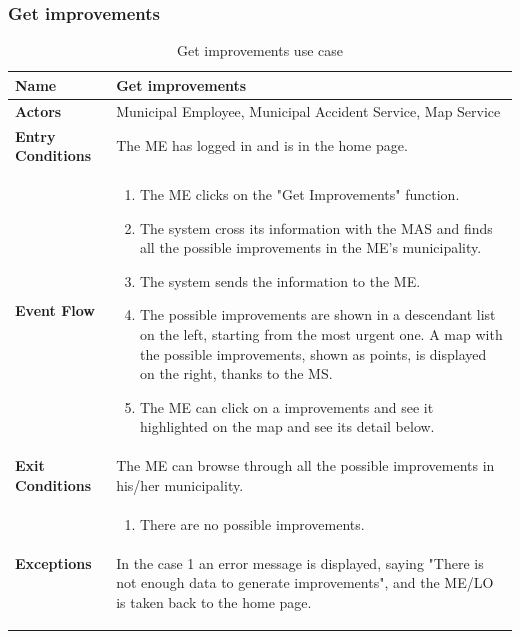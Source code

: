 					
					\clearpage
					\subsubsection{Get improvements}
					\begin{table}[!h]
						\centering
						\vspace{-2mm}
						\begin{tabular}{lp{}}
							\toprule
							\textbf{Name} & \textbf{Get improvements} \\[1mm]
							\midrule
							\textbf{Actors} & Municipal Employee, Municipal Accident Service, Map Service \\[1mm]
							\textbf{Entry Conditions} & The ME has logged in and is in the home page. \vspace{1mm}\\
							\textbf{Event Flow} &
							\vspace{-5mm} 
							\begin{enumerate}
								\setlength\itemsep{0.2mm}
								\item The ME clicks on the "Get Improvements" function.
								\item The system cross its information with the MAS and finds all the possible improvements in the ME's municipality.
								\item The system sends the information to the ME.
								\item The possible improvements are shown in a descendant list on the left, starting from the most urgent one. A map with the possible improvements, shown as points, is displayed on the right, thanks to the MS.
								\item The ME can click on a improvements and see it highlighted on the map and see its detail below.
							\end{enumerate} \\
							\textbf{Exit Conditions} & The ME can browse through all the possible improvements in his/her municipality. \vspace{1mm}\\
							\textbf{Exceptions} & 
								\vspace{-5mm} 
								\begin{enumerate}
									\item There are no possible improvements.
								\end{enumerate}
								\vspace{-7mm}
								\paragraph{}
									In the case 1 an error message is displayed, saying "There is not enough data to generate improvements", and the ME/LO is taken back to the home page. \\
							\bottomrule
						\end{tabular}
						\caption{Get improvements use case}
					\end{table}
					\clearpage
